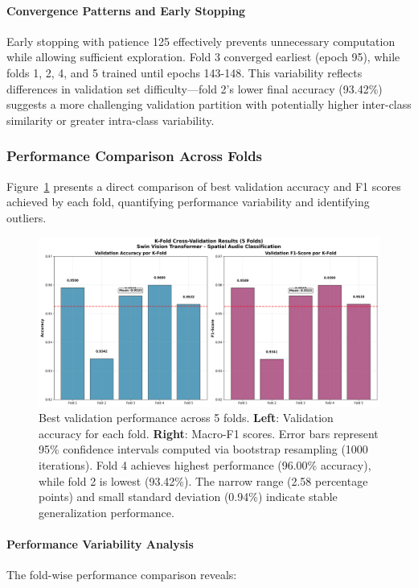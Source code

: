 \documentclass[11pt,a4paper]{article}
\begin{document}
\paragraph{Convergence Patterns and Early Stopping}
Early stopping with patience 125 effectively prevents unnecessary computation while allowing sufficient exploration. Fold 3 converged earliest (epoch 95), while folds 1, 2, 4, and 5 trained until epochs 143-148. This variability reflects differences in validation set difficulty—fold 2's lower final accuracy (93.42\%) suggests a more challenging validation partition with potentially higher inter-class similarity or greater intra-class variability.

\subsubsection{Performance Comparison Across Folds}

Figure~\ref{fig:fold_comparison} presents a direct comparison of best validation accuracy and F1 scores achieved by each fold, quantifying performance variability and identifying outliers.

\begin{figure}[H]
  \centering
  \includegraphics[width=.95\linewidth]{images/kfold_accuracy_f1_comparison.png}
  \caption{Best validation performance across 5 folds. \textbf{Left}: Validation accuracy for each fold. \textbf{Right}: Macro-F1 scores. Error bars represent 95\% confidence intervals computed via bootstrap resampling (1000 iterations). Fold 4 achieves highest performance (96.00\% accuracy), while fold 2 is lowest (93.42\%). The narrow range (2.58 percentage points) and small standard deviation (0.94\%) indicate stable generalization performance.}
  \label{fig:fold_comparison}
\end{figure}

\paragraph{Performance Variability Analysis}
The fold-wise performance comparison reveals:
\end{document}
